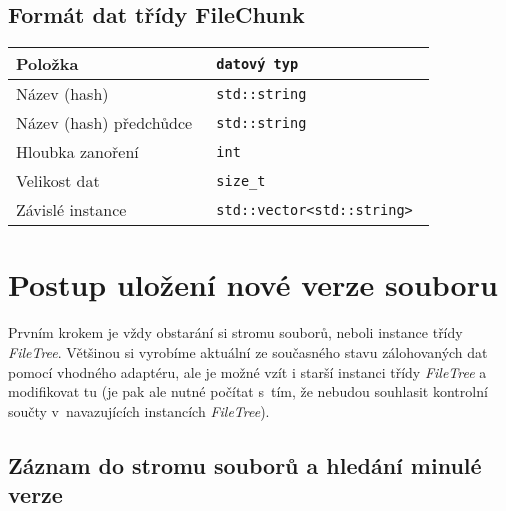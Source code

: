 \subsection{Formát dat třídy FileChunk}

\begin{tabular}{l >{\tt}l}
\bf Položka & \bf datový typ \\
\hline
Název (hash) & std::string \\
Název (hash) předchůdce & std::string \\
Hloubka zanoření & int \\
Velikost dat & size\_t \\
Závislé instance & std::vector<std::string> \\
\end{tabular}

\section{Postup uložení nové verze souboru}

Prvním krokem je vždy obstarání si stromu souborů, neboli instance třídy
{\it FileTree}. Většinou si vyrobíme aktuální ze současného stavu zálohovaných
dat pomocí vhodného adaptéru, ale je možné vzít i starší instanci třídy
{\it FileTree} a modifikovat tu (je pak ale nutné počítat s~tím, že nebudou
souhlasit kontrolní součty v~navazujících instancích {\it FileTree}).

\newpage

\subsection{Záznam do stromu souborů a hledání minulé verze}

